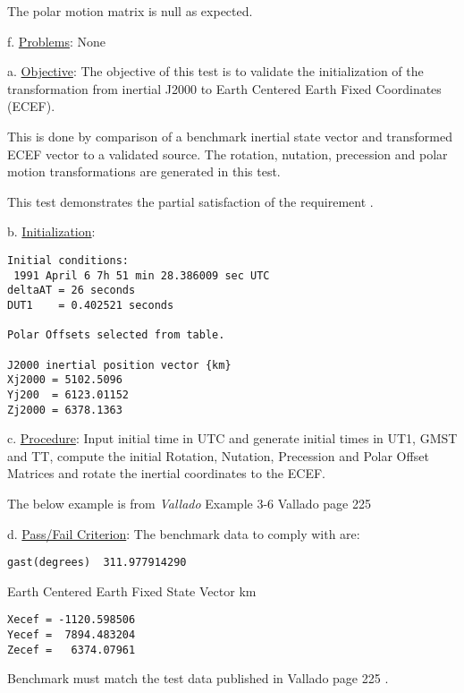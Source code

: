 The polar motion matrix is null as expected.\newline

f. \underline{Problems}:\newline
None\newline


      \label{test:rnp_test5}

a. \underline{Objective}:\newline
The objective of this test is to validate the initialization
of the transformation from inertial J2000 to Earth Centered Earth Fixed
Coordinates (ECEF).

This is done by comparison of a benchmark inertial state vector
and transformed ECEF vector to a validated source.
The rotation, nutation, precession and polar
motion transformations are generated in this test.

This test demonstrates the partial satisfaction
of the requirement .
\newline

b. \underline{Initialization}:
\begin{verbatim}
Initial conditions:
 1991 April 6 7h 51 min 28.386009 sec UTC
deltaAT = 26 seconds
DUT1    = 0.402521 seconds

Polar Offsets selected from table.

J2000 inertial position vector {km}
Xj2000 = 5102.5096
Yj200  = 6123.01152
Zj2000 = 6378.1363
\end{verbatim}

c. \underline{Procedure}:\newline
Input initial time in UTC and generate initial times in UT1,
GMST and TT, compute the
initial Rotation, Nutation, Precession and Polar Offset Matrices
and rotate the inertial coordinates to the ECEF.

The below example is from  {\em Vallado} \cite{VMcC}
Example 3-6 Vallado page 225\newline

d. \underline{Pass/Fail Criterion}:\newline
The benchmark data to comply with are:
\begin{verbatim}
gast(degrees)  311.977914290
\end{verbatim}

Earth Centered Earth Fixed State Vector {km}
\begin{verbatim}
Xecef = -1120.598506
Yecef =  7894.483204
Zecef =   6374.07961
\end{verbatim}
Benchmark must match the test data published in Vallado page 225 \cite{VMcC}.

